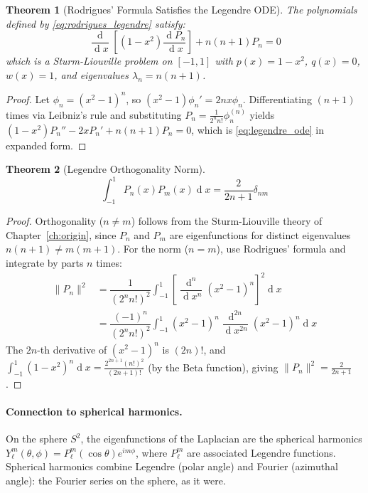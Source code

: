\documentclass[12pt,a4paper]{report}
\DeclareMathOperator{\deriv}{d}
\theoremstyle{thms}
\newtheorem{theorem}{Theorem}[section]
\theoremstyle{defns}
\begin{document}
\begin{theorem}[Rodrigues' Formula Satisfies the Legendre ODE]
    The polynomials defined by \eqref{eq:rodrigues_legendre} satisfy:
    \begin{equation}
        \dfrac{\deriv}{\deriv x}\left[(1 - x^2)\dfrac{\deriv P_n}{\deriv x}\right] + n(n+1)P_n = 0
        \label{eq:legendre_ode}
    \end{equation}
    which is a Sturm-Liouville problem on $[-1, 1]$ with $p(x) = 1 - x^2$, $q(x) = 0$, $w(x) = 1$, and eigenvalues $\lambda_n = n(n+1)$.
\end{theorem}

\begin{proof}
    Let $\phi_n = (x^2 - 1)^n$, so $(x^2 - 1)\phi_n' = 2nx\phi_n$. Differentiating $(n+1)$ times via Leibniz's rule and substituting $P_n = \frac{1}{2^n n!}\phi_n^{(n)}$ yields $(1 - x^2)P_n'' - 2xP_n' + n(n+1)P_n = 0$, which is \eqref{eq:legendre_ode} in expanded form.
\end{proof}

\begin{theorem}[Legendre Orthogonality Norm]
    \begin{equation}
        \int_{-1}^{1} P_n(x) P_m(x) \deriv{x} = \dfrac{2}{2n + 1}\delta_{nm}
    \end{equation}
    \label{thm:legendre_norm}
\end{theorem}

\begin{proof}
    Orthogonality ($n \neq m$) follows from the Sturm-Liouville theory of Chapter~\ref{ch:origin}, since $P_n$ and $P_m$ are eigenfunctions for distinct eigenvalues $n(n+1) \neq m(m+1)$. For the norm ($n = m$), use Rodrigues' formula and integrate by parts $n$ times:
    \begin{align}
        \|P_n\|^2 &= \dfrac{1}{(2^n n!)^2}\int_{-1}^{1}\left[\dfrac{\deriv^n}{\deriv x^n}(x^2-1)^n\right]^2\deriv{x} \\
        &= \dfrac{(-1)^n}{(2^n n!)^2}\int_{-1}^{1}(x^2-1)^n\dfrac{\deriv^{2n}}{\deriv x^{2n}}(x^2-1)^n\deriv{x}
    \end{align}
    The $2n$-th derivative of $(x^2-1)^n$ is $(2n)!$, and $\int_{-1}^{1}(1-x^2)^n\deriv{x} = \frac{2^{2n+1}(n!)^2}{(2n+1)!}$ (by the Beta function), giving $\|P_n\|^2 = \frac{2}{2n+1}$.
\end{proof}

\paragraph{Connection to spherical harmonics.} On the sphere $S^2$, the eigenfunctions of the Laplacian are the spherical harmonics $Y_\ell^m(\theta, \phi) = P_\ell^m(\cos\theta)e^{im\phi}$, where $P_\ell^m$ are associated Legendre functions. Spherical harmonics combine Legendre (polar angle) and Fourier (azimuthal angle): the Fourier series on the sphere, as it were.
\end{document}
